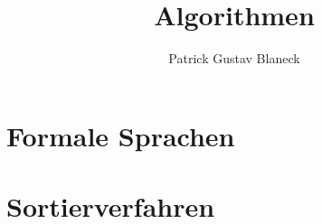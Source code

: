 \documentclass[german]{../spicker}
\title{Algorithmen}
\author{Patrick Gustav Blaneck}
\begin{document}
\maketitle
\tableofcontents
\newpage









\section{Formale Sprachen}




\section{Sortierverfahren}
\end{document}
